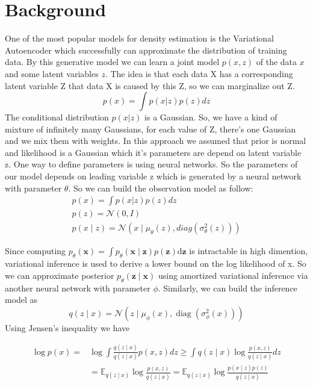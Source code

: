 \documentclass[12pt]{article}
\begin{document}
\section{Background}

One of the most popular models for density estimation is the Variational Autoencoder \cite{kingma2013auto} which successfully can approximate the distribution of training data. By this generative model we can learn a joint model $p(x,z)$ of the data $x$ and some latent variables $z$. The idea is that each data X has a corresponding latent variable Z that data X is caused by this Z, so we can marginalize out Z. 
$$p(x)=\int p(x | z) p(z) dz$$
The conditional distribution $p(x | z)$ is a Gaussian. So, we have a kind of mixture of infinitely many Gaussians, for each value of Z, there's one Gaussian and we mix them with weights. In this approach we assumed that prior is normal and likelihood is a Gaussian which it's parameters are depend on latent variable z. One way to define parameters is using neural networks. So the parameters of our model depends on leading variable z which is generated by a neural network with parameter $\theta$. So we can build the observation model as follow:
$$\begin{array}{l}
p(x)=\int p(x | z) p(z) dz \\
p(z)=\mathcal{N}(0, I) \\
p(x \mid z)=\mathcal{N}\left(x \mid \mu_{\theta}(z), diag\left(\sigma_{\theta}^{2}(z)\right)\right)
\end{array}$$


Since computing $p_{\theta}(\mathbf{x})=\int p_{\theta}(\mathbf{x} \mid \mathbf{z}) p(\mathbf{z}) \mathrm{d} \mathbf{z}$ is intractable in high dimention, variational inference is used to derive a lower bound on the log likelihood of x. So we can approximate posterior $p_{\theta}(\mathbf{z} \mid \mathbf{x})$ using amortized variational inference via another neural network with parameter $\phi$. Similarly, we can build the inference model as
$$
q(z \mid x)=\mathcal{N}\left(z \mid \mu_{\phi}(x), \operatorname{diag}\left(\sigma_{\phi}^{2}(x)\right)\right)
$$
Using Jensen’s inequality we have

$$
\begin{aligned}
\log p(x)=& \log \int \frac{q(z \mid x)}{q(z \mid x)} p(x, z) d z  \geq \int q(z \mid x) \log \frac{p(x, z)}{q(z \mid x)} d z \\
&=\mathbb{E}_{q(z \mid x)} \log \frac{p(x, z)}{q(z \mid x)} =\mathbb{E}_{q(z \mid x)} \log \frac{p(x \mid z) p(z)}{q(z \mid x)}
\end{aligned}
$$
\end{document}
